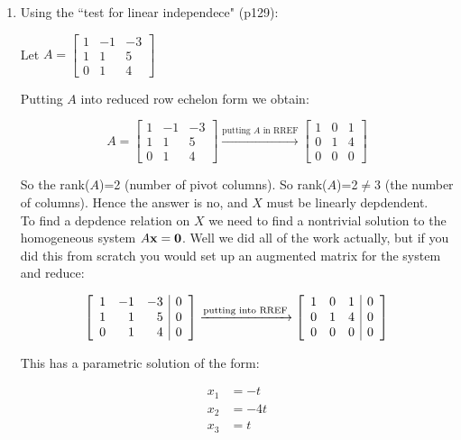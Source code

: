 \documentclass[12pt]{article}
\begin{document}
\begin{enumerate}
\item Using the ``test for linear independece" (p129):

Let $A=\left[ \begin{array}{rrr} 1 & -1 & -3  \\ 1 & 1 & 5 \\ 0&1&4  \end{array} \right] $

Putting $A$ into reduced row echelon form we obtain:

\[ A=\left[ \begin{array}{rrr} 1 & -1 & -3  \\ 1 & 1 & 5 \\ 0&1&4  \end{array} \right] \xrightarrow[]{\text{putting } A \text{ in RREF}}  \left[ \begin{array}{rrr} 1 & 0 & 1  \\ 0 & 1 & 4 \\ 0&0&0  \end{array} \right]
\]

So the rank($A$)=2 (number of pivot columns).  So rank($A$)=2$\neq$3 (the number of columns). Hence the answer is \colorbox{myblue}{no}, and $X$ must be linearly depdendent.\\

To find a depdence relation on $X$ we need to find a nontrivial solution to the homogeneous system $A{\bf x} ={\bf 0}$. Well we did all of the work actually, but if you did this from scratch you would set up an augmented matrix for the system and reduce:

\[ \left[ \begin{array}{rrr| r} 1 & -1 & -3 & 0 \\ 1 & 1 & 5 & 0 \\ 0&1&4 &0 \end{array} \right] \xrightarrow[]{\text{putting into RREF}}  \left[ \begin{array}{rrr| r} 1 & 0 & 1 &0 \\ 0 & 1 & 4& 0 \\ 0&0&0& 0  \end{array} \right]
\]

This has a parametric solution of the form:

\begin{align*}
x_1 &= -t\\
x_2 &= -4t\\
x_3 &= t 
\end{align*}


\end{enumerate}
\end{document}
